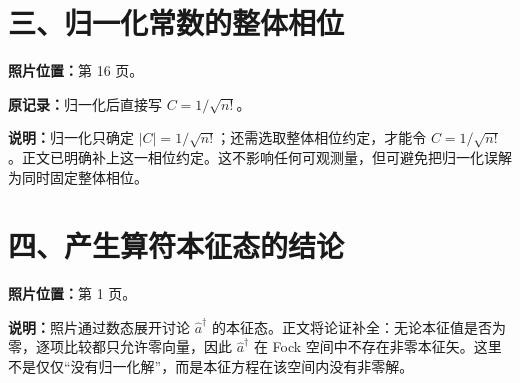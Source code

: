 \documentclass[UTF8,12pt,a4paper,fontset=fandol]{ctexart}
\begin{document}
\section*{三、归一化常数的整体相位}
\textbf{照片位置：}第 16 页。

\textbf{原记录：}归一化后直接写 $C=1/\sqrt{n!}$。

\textbf{说明：}归一化只确定 $\left|C\right|=1/\sqrt{n!}$；还需选取整体相位约定，才能令
$C=1/\sqrt{n!}$。正文已明确补上这一相位约定。这不影响任何可观测量，但可避免把归一化误解为同时固定整体相位。

\section*{四、产生算符本征态的结论}
\textbf{照片位置：}第 1 页。

\textbf{说明：}照片通过数态展开讨论 $\hat a^\dagger$ 的本征态。正文将论证补全：无论本征值是否为零，逐项比较都只允许零向量，因此 $\hat a^\dagger$ 在 Fock 空间中不存在非零本征矢。这里不是仅仅“没有归一化解”，而是本征方程在该空间内没有非零解。
\end{document}
